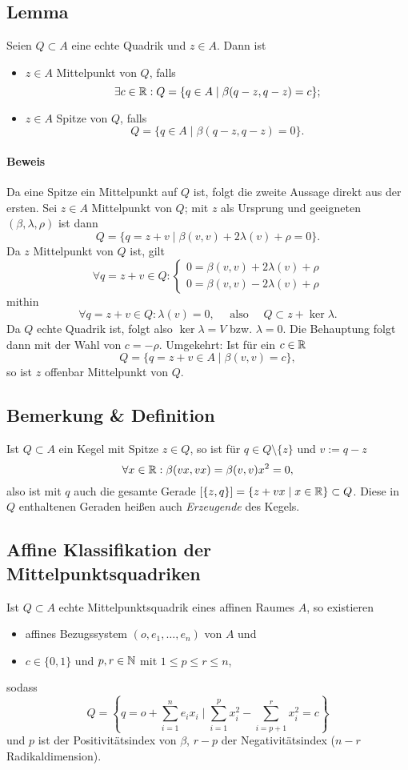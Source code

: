 \subsection{Lemma}
\begin{Lemma}[]
	Seien $ Q\subset A $ eine echte Quadrik und $ z\in A $. Dann ist
	\begin{itemize}
		\item $ z\in A $ Mittelpunkt von $ Q $, falls
			\[ \exists c\in \mathbb{R}: Q=\{q\in A\mid \beta(q-z,q-z)=c \}; \]
		\item $ z\in A $ Spitze von $ Q $, falls
			\[ Q=\{q\in A\mid \beta(q-z,q-z) = 0\}. \]
	\end{itemize}
\end{Lemma}
\paragraph{Beweis}
	Da eine Spitze ein Mittelpunkt auf $ Q $ ist, folgt die zweite Aussage direkt aus der ersten.
	Sei $ z\in A $ Mittelpunkt von $ Q $; mit $ z $ als Ursprung und geeigneten $ (\beta,\lambda,\rho) $ ist dann
		\[ Q=\{q=z+v\mid \beta(v,v)+2\lambda(v)+\rho = 0\}. \]
	Da $ z $ Mittelpunkt von $ Q $ ist, gilt
		\[ \forall q=z+v\in Q: \begin{cases}
		0 = \beta(v,v)+2\lambda(v)+\rho\\
		0 = \beta(v,v)-2\lambda(v)+\rho
		\end{cases} \]
	mithin
		\[ \forall q=z+v\in Q: \lambda(v) = 0,\quad \text{ also }\quad Q\subset z +\ker \lambda. \]
	Da $ Q $ echte Quadrik ist, folgt also $ \ker \lambda = V $ bzw. $ \lambda = 0 $. Die Behauptung folgt dann mit der Wahl von $ c=-\rho $. Umgekehrt: Ist für ein $ c\in \mathbb{R} $
		\[ Q=\{q=z+v\in A\mid \beta(v,v)=c \}, \]
	so ist $ z $ offenbar Mittelpunkt von $ Q $.
\subsection{Bemerkung \& Definition}
	Ist $ Q\subset A $ ein Kegel mit Spitze $ z\in Q $, so ist für $ q\in Q\setminus\{z\} $ und $ v:= q-z $
		\[ \forall x\in \mathbb{R}: \beta(vx,vx)= \beta(v,v)x^2 = 0,  \]
	also ist mit $ q $ auch die gesamte Gerade $ [\{z,q\}] = \{z+vx\mid x\in \mathbb{R}\}\subset Q $. Diese in $ Q $ enthaltenen Geraden heißen auch \emph{Erzeugende} des Kegels.
\subsection{Affine Klassifikation der Mittelpunktsquadriken}
\begin{Lemma}[]
	Ist $ Q\subset A $ echte Mittelpunktsquadrik eines affinen Raumes $ A $, so existieren
	\begin{itemize}
		\item affines Bezugssystem $ (o,e_1,\dots,e_n) $ von $ A $ und
		\item $ c\in \{0,1\} $ und $ p,r\in \mathbb{N} $ mit $ 1\leq p\leq r \leq n $, 
	\end{itemize}
	sodass 
		\[ Q=\left\{q=o+\sum_{i=1}^{n}e_ix_i\mid \sum_{i=1}^{p}x_i^2-\sum_{i=p+1}^{r}x_i^2 = c \right\} \]
	und $ p $ ist der Positivitätsindex von $ \beta $, $ r-p $ der Negativitätsindex ($ n-r $ Radikaldimension). 
\end{Lemma}
